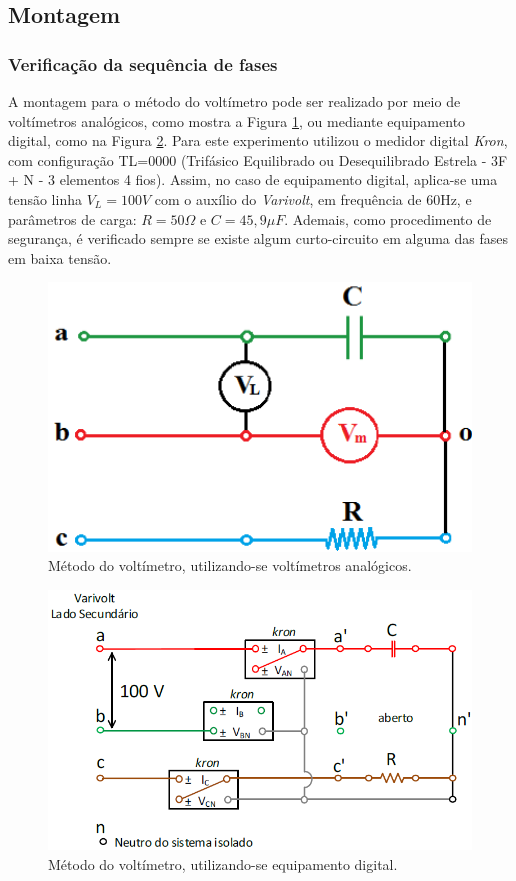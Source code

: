 \documentclass[a4paper,12pt,oneside,openany,table,xcdraw]{article}
\begin{document}
\vspace{0.2cm}
\subsection{Montagem} %

\subsubsection{Verificação da sequência de fases}
A montagem para o método do voltímetro pode ser realizado por meio de voltímetros analógicos, como mostra a Figura \ref{m1:analogico}, ou mediante equipamento digital, como na Figura \ref{m1:esquema}. Para este experimento utilizou o medidor digital \emph{Kron}, com configuração TL=0000 (Trifásico Equilibrado ou Desequilibrado Estrela - 3F + N - 3 elementos 4 fios). 
Assim, no caso de equipamento digital, aplica-se uma tensão linha $V_L=100V$ com o auxílio do \emph{Varivolt}, em frequência de 60Hz, e parâmetros de carga: $R=50\Omega$ e $C=45,9 \mu F$. Ademais, como procedimento de segurança, é verificado sempre se existe algum curto-circuito em alguma das fases em baixa tensão.

\vspace{0.2cm}
\begin{figure}[H]
\centering
\includegraphics[width=11.5cm]{m-analog}
\caption{Método do voltímetro, utilizando-se voltímetros analógicos.}
\label{m1:analogico}
\end{figure}

\vspace{2cm}
\begin{figure}[H]
\centering
\includegraphics[width=13cm]{m1-circuito}
\caption{Método do voltímetro, utilizando-se equipamento digital.}
\label{m1:esquema}
\end{figure}
\end{document}
